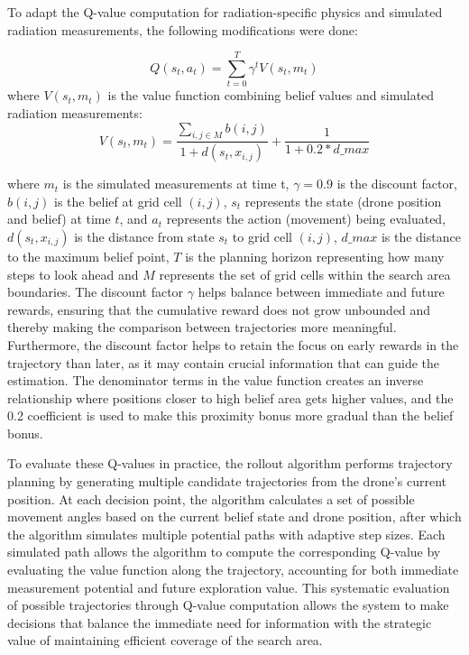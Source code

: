\documentclass[../report.tex]{subfiles}
\begin{document}
    
    To adapt the Q-value computation for radiation-specific physics and simulated radiation measurements, the following modifications were done:

    \begin{equation}
        Q(s_t,a_t) = \sum_{t=0}^{T} \gamma^t V(s_t, m_t)
    \end{equation}
    where $ V(s_t,m_t) $ is the value function combining belief values and simulated radiation measurements:
    \begin{equation}
        V(s_t,m_t) = \frac{\sum_{i,j \in M}b(i,j)}{1 + d(s_t, x_{i,j})} + \frac{1}{1 + 0.2*d\_max}
    \end{equation}

    where $ m_t $ is the simulated measurements at time t, $\gamma = 0.9$ is the discount factor, $b(i,j)$ is the belief at grid cell $(i,j)$, $s_t$ represents the state 
    (drone position and belief) at time $t$, and $a_t$ represents the action (movement) being evaluated, $d(s_t, x_{i,j})$ is the distance from state $s_t$ to grid cell $(i,j)$,
    $d\_max$ is the distance to the maximum belief point, $T$ is the planning horizon representing how many steps to look ahead and $M$ represents the set of grid cells within the search area boundaries.
    The discount factor $\gamma$ helps balance between immediate and future rewards, ensuring that the cumulative reward does not grow unbounded and thereby making the 
    comparison between trajectories more meaningful. Furthermore, the discount factor helps to retain the focus on early rewards in the trajectory than later, as it may contain crucial 
    information that can guide the estimation. The denominator terms in the value function creates an inverse relationship where positions closer to high belief area gets 
    higher values, and the 0.2 coefficient is used to make this proximity bonus more gradual than the belief bonus. 

    To evaluate these Q-values in practice, the rollout algorithm performs trajectory planning by generating multiple candidate trajectories from the drone's current position. At each decision 
    point,  the algorithm calculates a set of possible movement angles based on the current belief state and drone position, after which the algorithm simulates multiple potential paths with 
    adaptive step sizes. Each simulated path allows the algorithm to compute the corresponding Q-value by evaluating the value function along the trajectory, accounting for both immediate 
    measurement potential and future exploration value. This systematic evaluation of possible trajectories through Q-value computation allows the system to make decisions that balance the 
    immediate need for information with the strategic value of maintaining efficient coverage of the search area.
\end{document}
